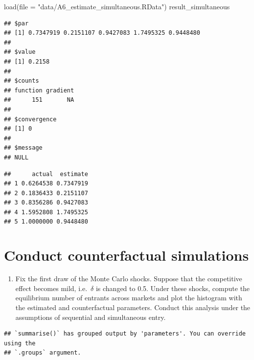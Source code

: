 \documentclass[
]{book}
\newenvironment{Shaded}{\begin{snugshade}}{\end{snugshade}}
\newcommand{\AttributeTok}[1]{\textcolor[rgb]{0.77,0.63,0.00}{#1}}
\newcommand{\FunctionTok}[1]{\textcolor[rgb]{0.00,0.00,0.00}{#1}}
\newcommand{\NormalTok}[1]{#1}
\newcommand{\OtherTok}[1]{\textcolor[rgb]{0.56,0.35,0.01}{#1}}
\newcommand{\SpecialCharTok}[1]{\textcolor[rgb]{0.00,0.00,0.00}{#1}}
\newcommand{\StringTok}[1]{\textcolor[rgb]{0.31,0.60,0.02}{#1}}
\providecommand{\tightlist}{%
  \setlength{\itemsep}{0pt}\setlength{\parskip}{0pt}}
\begin{document}
\begin{Shaded}
\begin{Highlighting}[]
\FunctionTok{load}\NormalTok{(}\AttributeTok{file =} \StringTok{"data/A6\_estimate\_simultaneous.RData"}\NormalTok{)}
\NormalTok{result\_simultaneous}
\end{Highlighting}
\end{Shaded}

\begin{verbatim}
## $par
## [1] 0.7347919 0.2151107 0.9427083 1.7495325 0.9448480
## 
## $value
## [1] 0.2158
## 
## $counts
## function gradient 
##      151       NA 
## 
## $convergence
## [1] 0
## 
## $message
## NULL
\end{verbatim}

\begin{Shaded}
\end{Shaded}

\begin{verbatim}
##      actual  estimate
## 1 0.6264538 0.7347919
## 2 0.1836433 0.2151107
## 3 0.8356286 0.9427083
## 4 1.5952808 1.7495325
## 5 1.0000000 0.9448480
\end{verbatim}

\hypertarget{conduct-counterfactual-simulations}{%
\section{Conduct counterfactual simulations}\label{conduct-counterfactual-simulations}}

\begin{enumerate}
\def\labelenumi{\arabic{enumi}.}
\tightlist
\item
  Fix the first draw of the Monte Carlo shocks. Suppose that the competitive effect becomes mild, i.e.~\(\delta\) is changed to 0.5. Under these shocks, compute the equilibrium number of entrants across markets and plot the histogram with the estimated and counterfactual parameters. Conduct this analysis under the assumptions of sequential and simultaneous entry.
\end{enumerate}

\begin{verbatim}
## `summarise()` has grouped output by 'parameters'. You can override using the
## `.groups` argument.
\end{verbatim}
\end{document}
